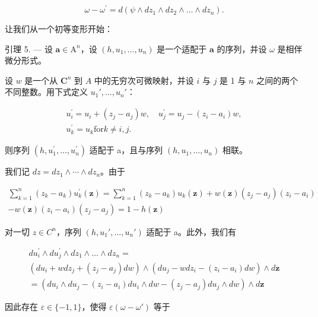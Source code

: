 \[
\omega - \omega^ {\prime} = d (\psi \wedge d z _ {1} \wedge d z _ {2} \wedge \dots \wedge d z _ {n}).
\]

让我们从一个初等变形开始：

引理 5. --- 设 \(\boldsymbol{a} \in \mathrm{A}^{n}\)，设 \((h, u_{1}, \ldots, u_{n})\) 是一个适配于 \(\boldsymbol{a}\) 的序列，并设 \(\omega\) 是相伴微分形式。

设 \(w\) 是一个从 \(\mathbf{C}^n\) 到 \(A\) 中的无穷次可微映射，并设 \(i\) 与 \(j\) 是 1 与 \(n\) 之间的两个不同整数。用下式定义 \(u_1', \ldots, u_n'\)：

\[
\begin{array}{c} u _ {i} ^ {\prime} = u _ {i} + (z _ {j} - a _ {j}) w, \quad u _ {j} ^ {\prime} = u _ {j} - (z _ {i} - a _ {i}) w, \\ u _ {k} ^ {\prime} = u _ {k} \text {for} k \neq i, j. \end{array}
\]

则序列 \((h,u_{1}^{\prime},\ldots,u_{n}^{\prime})\) 适配于 a，且与序列 \((h,u_{1},\ldots,u_{n})\) 相联。

我们记 \(dz = dz_{1} \wedge \cdots \wedge dz_{n}\)。由于

\[
\begin{array}{c} \sum_ {k = 1} ^ {n} (z _ {k} - a _ {k}) u _ {k} ^ {\prime} (\boldsymbol {z}) = \sum_ {k = 1} ^ {n} (z _ {k} - a _ {k}) u _ {k} (\boldsymbol {z}) + w (\boldsymbol {z}) (z _ {j} - a _ {j}) (z _ {i} - a _ {i}) \\ - w (\boldsymbol {z}) (z _ {i} - a _ {i}) (z _ {j} - a _ {j}) = 1 - h (\boldsymbol {z}) \end{array}
\]

对一切 \(z \in C^{n}\)，序列 \((h, u_{1}', \ldots, u_{n}')\) 适配于 a。此外，我们有

\[
\begin{array}{l} d u _ {i} ^ {\prime} \wedge d u _ {j} ^ {\prime} \wedge d z _ {1} \wedge \dots \wedge d z _ {n} = \\ \left(d u _ {i} + w d z _ {j} + (z _ {j} - a _ {j}) d w\right) \wedge \left(d u _ {j} - w d z _ {i} - (z _ {i} - a _ {i}) d w\right) \wedge d \boldsymbol {z} \\ = \left(d u _ {i} \wedge d u _ {j} - (z _ {i} - a _ {i}) d u _ {i} \wedge d w - (z _ {j} - a _ {j}) d u _ {j} \wedge d w\right) \wedge d \boldsymbol {z} \end{array}
\]

因此存在 \(\varepsilon\in\{-1,1\}\)，使得 \(\varepsilon(\omega-\omega')\) 等于

